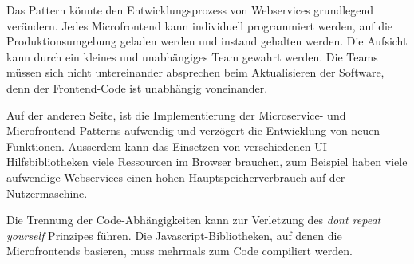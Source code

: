 Das Pattern könnte den Entwicklungsprozess von Webservices grundlegend verändern. Jedes Microfrontend kann individuell programmiert werden, auf die Produktionsumgebung geladen werden und instand gehalten werden. Die Aufsicht kann durch ein kleines und unabhängiges Team gewahrt werden. Die Teams müssen sich nicht untereinander absprechen beim Aktualisieren der Software, denn der Frontend-Code ist unabhängig voneinander.

Auf der anderen Seite,  ist die Implementierung der Microservice- und Microfrontend-Patterns aufwendig und verzögert die Entwicklung von neuen Funktionen. Ausserdem kann das Einsetzen von verschiedenen UI-Hilfsbibliotheken viele Ressourcen im Browser brauchen, zum Beispiel haben viele aufwendige Webservices einen hohen Hauptspeicherverbrauch auf der Nutzermaschine.

Die Trennung der Code-Abhängigkeiten kann zur Verletzung des \textit{dont repeat yourself} Prinzipes\cite{Hunt2008} führen. Die Javascript-Bibliotheken, auf denen die Microfrontends basieren, muss mehrmals zum Code compiliert werden.
\newpage